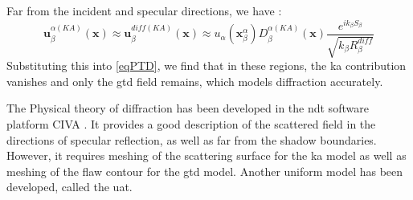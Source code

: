 Far from the incident and specular directions, we have :
\begin{equation}
\mathbf{u}_{\beta}^{\alpha(KA)}(\mathbf{x})\approx \mathbf{u}_{\beta}^{diff(KA)}(\mathbf{x}) \approx u_{\alpha}(\mathbf{x}_{\beta}^{\alpha})D_{\beta}^{\alpha(KA)}(\mathbf{x})\dfrac{e^{ik_{\beta}S_{\beta}}}{\sqrt{k_{\beta}R_{\beta}^{diff}}}
\end{equation}
Substituting this into \eqref{eqPTD}, we find that in these regions, the \acrshort{ka} contribution vanishes and only the \acrshort{gtd} field remains, which models diffraction accurately.

The Physical theory of diffraction has been developed in the \acrshort{ndt} software platform CIVA \cite{systmodel}. It provides a good description of the scattered field in the directions of specular reflection, as well as far from the shadow boundaries. However, it requires meshing of the scattering surface for the \acrshort{ka} model as well as meshing of the flaw contour for the \acrshort{gtd} model. Another uniform model has been developed, called the \acrfull{uat}.

